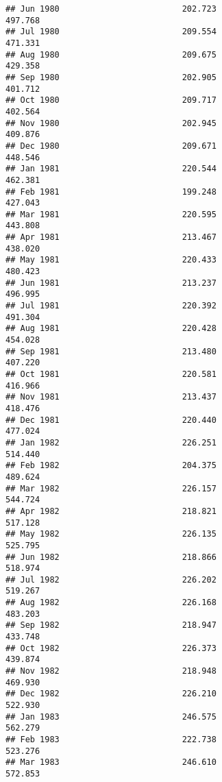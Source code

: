 \documentclass[
]{article}
\begin{document}
\begin{verbatim}
## Jun 1980                         202.723                           497.768
## Jul 1980                         209.554                           471.331
## Aug 1980                         209.675                           429.358
## Sep 1980                         202.905                           401.712
## Oct 1980                         209.717                           402.564
## Nov 1980                         202.945                           409.876
## Dec 1980                         209.671                           448.546
## Jan 1981                         220.544                           462.381
## Feb 1981                         199.248                           427.043
## Mar 1981                         220.595                           443.808
## Apr 1981                         213.467                           438.020
## May 1981                         220.433                           480.423
## Jun 1981                         213.237                           496.995
## Jul 1981                         220.392                           491.304
## Aug 1981                         220.428                           454.028
## Sep 1981                         213.480                           407.220
## Oct 1981                         220.581                           416.966
## Nov 1981                         213.437                           418.476
## Dec 1981                         220.440                           477.024
## Jan 1982                         226.251                           514.440
## Feb 1982                         204.375                           489.624
## Mar 1982                         226.157                           544.724
## Apr 1982                         218.821                           517.128
## May 1982                         226.135                           525.795
## Jun 1982                         218.866                           518.974
## Jul 1982                         226.202                           519.267
## Aug 1982                         226.168                           483.203
## Sep 1982                         218.947                           433.748
## Oct 1982                         226.373                           439.874
## Nov 1982                         218.948                           469.930
## Dec 1982                         226.210                           522.930
## Jan 1983                         246.575                           562.279
## Feb 1983                         222.738                           523.276
## Mar 1983                         246.610                           572.853

\end{verbatim}
\end{document}
